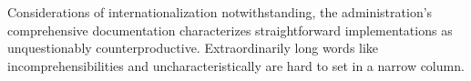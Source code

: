 \documentclass[11pt]{article}
\begin{document}
\sloppy
Considerations of internationalization notwithstanding, the
administration's comprehensive documentation characterizes straightforward
implementations as unquestionably counterproductive. Extraordinarily
long words like incomprehensibilities and uncharacteristically are hard to
set in a narrow column.
\end{document}
